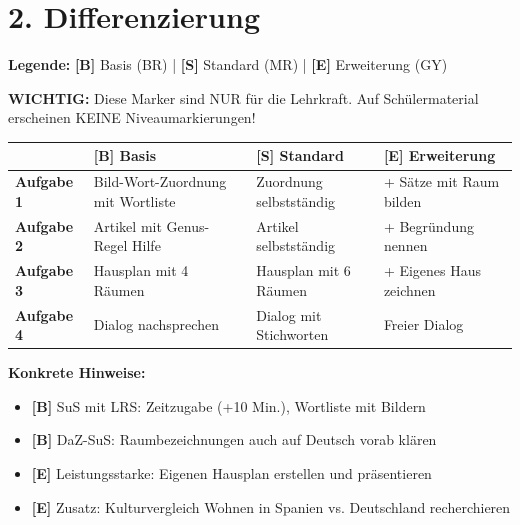 \documentclass[11pt, a4paper]{article}
\newcommand{\B}{\textcolor{basis}{\textbf{[B]}}}
\newcommand{\Std}{\textcolor{standard}{\textbf{[S]}}}
\newcommand{\E}{\textcolor{erweiterung}{\textbf{[E]}}}
\begin{document}

\section*{2. Differenzierung}

\begin{differenzierung}
\textbf{Legende:} \B{} Basis (BR) | \Std{} Standard (MR) | \E{} Erweiterung (GY)

\vspace{0.5em}

\textbf{WICHTIG:} Diese Marker sind NUR für die Lehrkraft. Auf Schülermaterial erscheinen KEINE Niveaumarkierungen!
\end{differenzierung}

\vspace{1em}

\begin{tabularx}{\textwidth}{|l|X|X|X|}
\hline
& \B{} \textbf{Basis} & \Std{} \textbf{Standard} & \E{} \textbf{Erweiterung} \\
\hline
\textbf{Aufgabe 1} & Bild-Wort-Zuordnung mit Wortliste & Zuordnung selbstständig & + Sätze mit Raum bilden \\
\hline
\textbf{Aufgabe 2} & Artikel mit Genus-Regel Hilfe & Artikel selbstständig & + Begründung nennen \\
\hline
\textbf{Aufgabe 3} & Hausplan mit 4 Räumen & Hausplan mit 6 Räumen & + Eigenes Haus zeichnen \\
\hline
\textbf{Aufgabe 4} & Dialog nachsprechen & Dialog mit Stichworten & Freier Dialog \\
\hline
\end{tabularx}

\vspace{1em}

\textbf{Konkrete Hinweise:}
\begin{itemize}
    \item \B{} SuS mit LRS: Zeitzugabe (+10 Min.), Wortliste mit Bildern
    \item \B{} DaZ-SuS: Raumbezeichnungen auch auf Deutsch vorab klären
    \item \E{} Leistungsstarke: Eigenen Hausplan erstellen und präsentieren
    \item \E{} Zusatz: Kulturvergleich Wohnen in Spanien vs. Deutschland recherchieren
\end{itemize}
\end{document}
